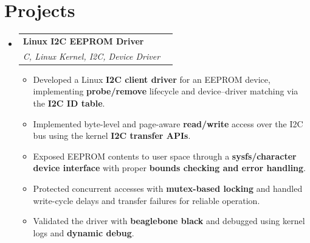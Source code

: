 \documentclass[letterpaper,11pt]{article}
\makeatletter
\newcommand{\resumeItem}[1]{
\item\small{
    {#1 \vspace{-2pt}}
  }
}
\newcommand{\resumeSubheading}[4]{
  \vspace{-2pt}
\item
  \begin{tabular*}{1.0\textwidth}[t]{l@{\extracolsep{\fill}}r}
    \textbf{#1} & \textbf{\small #2} \\
    \textit{\small#3} & \textit{\small #4} \\
  \end{tabular*}\vspace{-7pt}
}
\newcommand{\resumeSubHeadingListStart}{
\begin{itemize}[leftmargin=0.0in, label={}]}
\newcommand{\resumeSubHeadingListEnd}{
\end{itemize}}
\newcommand{\resumeItemListStart}{
\begin{itemize}}
\newcommand{\resumeItemListEnd}{
\end{itemize}\vspace{-5pt}}
\makeatother
\begin{document}

\section{Projects}
\vspace{-3pt}

\resumeSubHeadingListStart
\resumeSubheading
{Linux I2C EEPROM Driver}
{\href{https://github.com/ankitkhushwaha/linux-i2c-eeprom-driver}{\faGithub}}
{C, Linux Kernel, I2C, Device Driver}{}
\vspace{-5pt}
\resumeItemListStart
\resumeItem{Developed a Linux \textbf{I2C client driver} for an EEPROM device, implementing \textbf{probe/remove} lifecycle and device--driver matching via the \textbf{I2C ID table}.}
\resumeItem{Implemented byte-level and page-aware \textbf{read/write} access over the I2C bus using the kernel \textbf{I2C transfer APIs}.}
\resumeItem{Exposed EEPROM contents to user space through a \textbf{sysfs/character device interface} with proper \textbf{bounds checking and error handling}.}
\resumeItem{Protected concurrent accesses with \textbf{mutex-based locking} and handled write-cycle delays and transfer failures for reliable operation.}
\resumeItem{Validated the driver with \textbf{beaglebone black} and debugged using kernel logs and \textbf{dynamic debug}.}
\resumeItemListEnd
\vspace{-8pt}
\resumeSubHeadingListEnd
\end{document}
